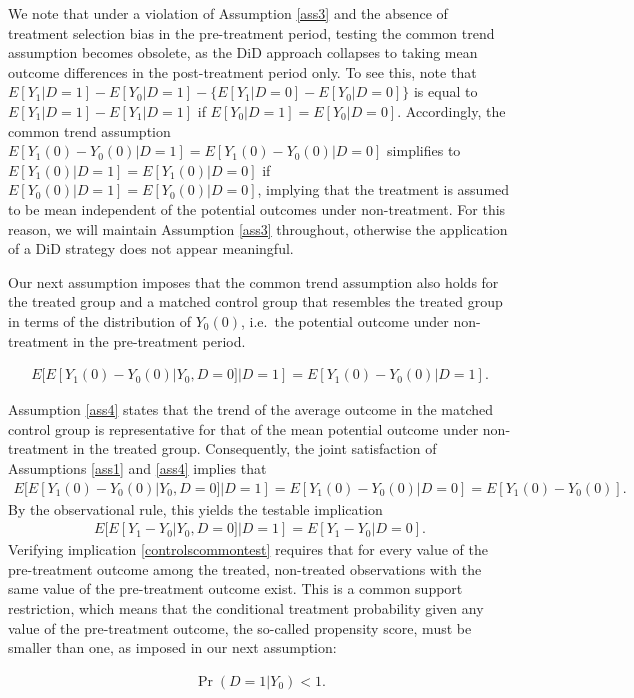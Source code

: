{We note that under a violation of Assumption \ref{ass3} and the absence of treatment selection bias in the pre-treatment period, testing the common trend assumption becomes obsolete, as the DiD approach collapses to taking mean outcome differences in the post-treatment period only. To see this, note that
$E[Y_1|D=1]-E[Y_0|D=1]-\{E[Y_1|D=0]-E[Y_0|D=0]\}$ is equal to $E[Y_1|D=1]-E[Y_1|D=1]$ if $E[Y_0|D=1]=E[Y_0|D=0]$. Accordingly, the common trend assumption
$E[Y_1(0)-Y_0(0)|D=1]=E[Y_1(0)-Y_0(0)|D=0]$ simplifies to $E[Y_1(0)|D=1]=E[Y_1(0)|D=0]$ if $E[Y_0(0)|D=1]=E[Y_0(0)|D=0]$, implying that the treatment is assumed to be mean independent of the potential outcomes under non-treatment. For this reason, we will maintain Assumption \ref{ass3} throughout, otherwise the application of a DiD strategy does not appear meaningful.
	
Our next assumption imposes that the common trend assumption also holds for the treated group and a matched control group that resembles the treated group in terms of the distribution of $Y_0(0)$, i.e.\ the potential outcome under non-treatment in the pre-treatment period.
	\begin{assumption}\label{ass4}
		\begin{eqnarray*}
			E[E[Y_1(0)-Y_0(0)|Y_0,D=0]|D=1]=E[Y_1(0)-Y_0(0)|D=1].
		\end{eqnarray*}
	\end{assumption}
	\noindent Assumption \ref{ass4} states that the trend of the average outcome in the matched control group is representative for that of the mean potential outcome under non-treatment in the treated group. Consequently, the joint satisfaction of Assumptions \ref{ass1} and \ref{ass4} implies that
	\begin{eqnarray}\label{controlscommon}
		E[E[Y_1(0)-Y_0(0)|Y_0,D=0]|D=1]=E[Y_1(0)-Y_0(0)|D=0]=E[Y_1(0)-Y_0(0)].
	\end{eqnarray}
	By the observational rule, this yields the testable implication
	\begin{eqnarray}\label{controlscommontest}
		E[E[Y_1-Y_0|Y_0,D=0]|D=1]=E[Y_1-Y_0|D=0].
	\end{eqnarray}
	\noindent Verifying implication \eqref{controlscommontest} requires that for every value of the pre-treatment outcome among the treated, non-treated observations with the same value of the pre-treatment outcome exist. This is a common support restriction, which means that the conditional treatment probability given any value of the pre-treatment outcome, the so-called propensity score, must be smaller than one, as imposed in our next assumption:
	\begin{assumption}\label{commsup}
		\begin{eqnarray*}
			\Pr(D=1|Y_0)<1.
		\end{eqnarray*}
	\end{assumption}

}
